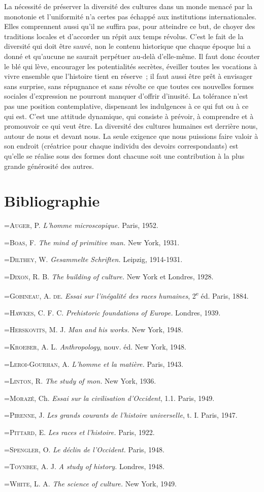 \documentclass[french,twoside]{book} %
\newcommand\surname[1]{\textsc{#1}}
\newcommand{\biblitem}[1]{{\noindent\hangindent=\parindent   #1\par}}
\begin{document}
La nécessité de préserver la diversité des cultures dans un monde menacé par la monotonie et l’uniformité n’a certes pas échappé aux institutions internationales. Elles comprennent aussi qu’il ne suffira pas, pour atteindre ce but, de choyer des traditions locales et d’accorder un répit aux temps révolus. C’est le fait de la diversité qui doit être sauvé, non le contenu historique que chaque époque lui a donné et qu’aucune ne saurait perpétuer au-delà d’elle-même. Il faut donc écouter le blé qui lève, encourager les potentialités secrètes, éveiller toutes les vocations à vivre ensemble que l’histoire tient en réserve ; il faut aussi être prêt à envisager sans surprise, sans répugnance et sans révolte ce que toutes ces nouvelles formes sociales d’expression ne pourront manquer d’offrir d’inusité. La tolérance n’est pas une position contemplative, dispensant les indulgences à ce qui fut ou à ce qui est. C’est une attitude dynamique, qui consiste à prévoir, à comprendre et à promouvoir ce qui veut être. La diversité des cultures humaines est derrière nous, autour de nous et devant nous. La seule exigence que nous puissions faire valoir à son endroit (créatrice pour chaque individu des devoirs correspondants) est qu’elle se réalise sous des formes dont chacune soit une contribution à la plus grande générosité des autres.

\section[{Bibliographie}]{Bibliographie}
\renewcommand{\leftmark}{Bibliographie}

\biblitem{\surname{Auger}, P. \emph{L’homme microscopique.} Paris, 1952.}
\biblitem{\surname{Boas}, F. \emph{The mind of primitive man.} New York, 1931.}
\biblitem{\surname{Dilthey}, W. \emph{Gesammelte Schriften.} Leipzig, 1914-1931.}
\biblitem{\surname{Dixon}, R. B. \emph{The building of culture.} New York et Londres, 1928.}
\biblitem{\surname{Gobineau, A. de.} \emph{Essai sur l’inégalité des races humaines}, 2\textsuperscript{e} éd. Paris, 1884.}
\biblitem{\surname{Hawkes}, C. F. C. \emph{Prehistoric foundations of Europe.} Londres, 1939.}
\biblitem{\surname{Herskovits}, M. J. \emph{Man and his works.} New York, 1948.}
\biblitem{\surname{Kroeber}, A. L. \emph{Anthropology}, nouv. éd. New York, 1948.}
\biblitem{\surname{Leroi-Gourhan}, A. \emph{L’homme et la matière.} Paris, 1943.}
\biblitem{\surname{Linton}, R. \emph{The study of mon.} New York, 1936.}
\biblitem{\surname{Morazé}, Ch. \emph{Essai sur la civilisation d’Occident}, 1.1. Paris, 1949.}
\biblitem{\surname{Pirenne}, J. \emph{Les grands courants de l’histoire universelle}, t. I. Paris, 1947.}
\biblitem{\surname{Pittard}, E. \emph{Les races et l’histoire.} Paris, 1922.}
\biblitem{\surname{Spengler}, O. \emph{Le déclin de l’Occident.} Paris, 1948.}
\biblitem{\surname{Toynbee}, A. J. \emph{A study of history.} Londres, 1948.}
\biblitem{\surname{White}, L. A. \emph{The science of culture.} New York, 1949.}
 
\end{document}
